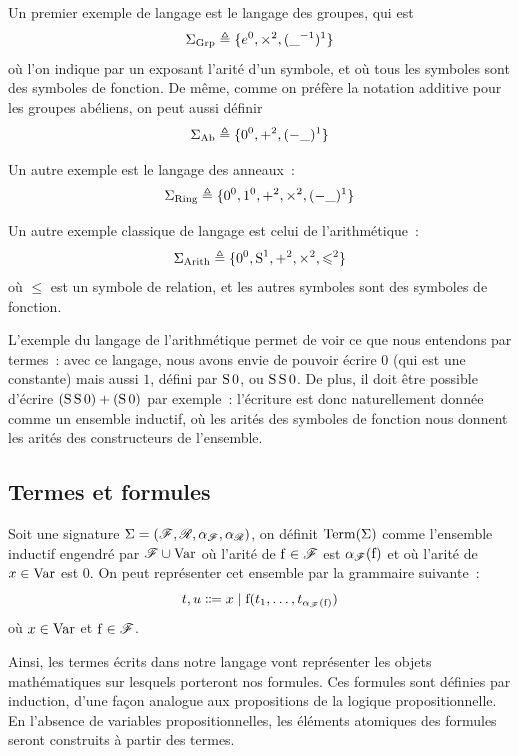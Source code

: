 \begin{example}
  Un premier exemple de langage est le langage des groupes, qui est
  \[\Sigma_{\operatorname{Grp}} \triangleq \{e^0,\times^2,(\mathord{\_}^{-1})^1\}\]
  où l'on indique par un exposant l'arité d'un symbole, et où tous les symboles
  sont des symboles de fonction. De même, comme on préfère la notation additive
  pour les groupes abéliens, on peut aussi définir
  \[\Sigma_{\operatorname{Ab}} \triangleq \{0^0,+^2,(-\mathord{\_})^1\}\]
\end{example}

\begin{example}
  Un autre exemple est le langage des anneaux~:
  \[\Sigma_{\operatorname{Ring}}\triangleq \{0^0,1^0,+^2,\times^2,(-\mathord{\_})^1\}\]
\end{example}

\begin{example}
  Un autre exemple classique de langage est celui de l'arithmétique~:
  \[\Sigma_{\operatorname{Arith}}\triangleq \{0^0, \operatorname{S}^1, +^2,\times^2,\leqslant^2\}\]
  où $\leq$ est un symbole de relation, et les autres symboles sont des symboles
  de fonction.
\end{example}

L'exemple du langage de l'arithmétique permet de voir ce que nous entendons par
termes~: avec ce langage, nous avons envie de pouvoir écrire $0$ (qui est une
constante) mais aussi $1$, défini par $\operatorname{S} 0$, ou $\operatorname{S}\operatorname{S} 0$.
De plus, il doit
être possible d'écrire $(\operatorname{S}\operatorname{S} 0) + (\operatorname{S} 0)$ par exemple~: l'écriture est donc
naturellement donnée comme un ensemble inductif, où les arités des symboles de
fonction nous donnent les arités des constructeurs de l'ensemble.

\subsection{Termes et formules}

\begin{definition}[Termes]
  Soit une signature
  $\Sigma = (\mathscr F,\mathscr R, \alpha_{\mathscr F},\alpha_{\mathscr R})$,
  on définit $\operatorname{Term}(\Sigma)$ comme l'ensemble inductif engendré par
  $\mathscr F\cup\operatorname{Var}$ où l'arité de $\mathrm{f}\in\mathscr F$ est
  $\alpha_{\mathscr F}(\mathrm{f})$ et où l'arité de $x\in \operatorname{Var}$ est $0$. On peut représenter
  cet ensemble par la grammaire suivante~:
  \[t,u \inddefeq x \mid \symbF(t_1,\ldots,t_{\aritFun(\symbF)})\]
  où $x\in \operatorname{Var}$ et $\mathrm{f}\in \mathscr F$.
\end{definition}

Ainsi, les termes écrits dans notre langage vont représenter les objets
mathématiques sur lesquels porteront nos formules. Ces formules sont définies
par induction, d'une façon analogue aux propositions de la logique
propositionnelle. En l'absence de variables propositionnelles, les éléments
atomiques des formules seront construits à partir des termes.

